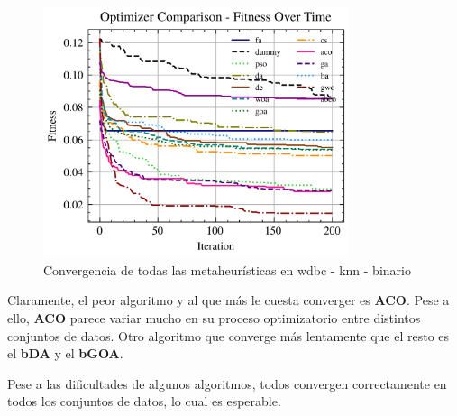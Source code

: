 \begin{figure}[htp]
    \includegraphics[width=0.8\textwidth]{imagenes/fitness_charts/img/binary/wdbc/optimizers_fitness_knn.png}
    \caption{Convergencia de todas las metaheurísticas en wdbc - knn - binario}
\end{figure}

Claramente, el peor algoritmo y al que más le cuesta converger es \textbf{ACO}. Pese a ello, \textbf{ACO} parece variar mucho en su proceso optimizatorio entre distintos conjuntos de datos. Otro algoritmo que converge más lentamente que el resto es el \textbf{bDA} y el \textbf{bGOA}.

Pese a las dificultades de algunos algoritmos, todos convergen correctamente en todos los conjuntos de datos, lo cual es esperable.
\clearpage

